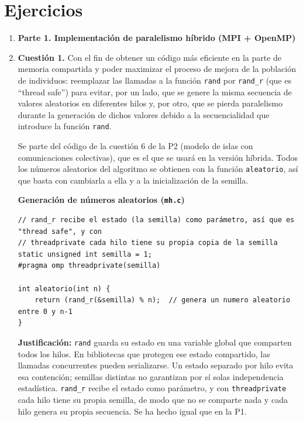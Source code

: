 \documentclass[12pt]{article}
\begin{document}
\newpage

\section{Ejercicios}

\begin{enumerate}

\item[] \textbf{\large Parte 1. Implementación de paralelismo híbrido (MPI + OpenMP)}

\item \textbf{Cuestión 1.} Con el fin de obtener un código más eficiente en la parte de memoria compartida y poder maximizar el proceso de mejora de la población de individuos: reemplazar las llamadas a la función \texttt{rand} por \texttt{rand\_r} (que es ``thread safe'') para evitar, por un lado, que se genere la misma secuencia de valores aleatorios en diferentes hilos y, por otro, que se pierda paralelismo durante la generación de dichos valores debido a la secuencialidad que introduce la función \texttt{rand}.


Se parte del código de la cuestión 6 de la P2 (modelo de islas con comunicaciones colectivas), que es el que se usará en la versión híbrida. Todos los números aleatorios del algoritmo se obtienen con la función \texttt{aleatorio}, así que basta con cambiarla a ella y a la inicialización de la semilla.

\medskip
\noindent\textbf{Generación de números aleatorios (\texttt{mh.c})}\par
\smallskip

\begin{lstlisting}[style=EstiloC]
// rand_r recibe el estado (la semilla) como parámetro, así que es "thread safe", y con
// threadprivate cada hilo tiene su propia copia de la semilla
static unsigned int semilla = 1;
#pragma omp threadprivate(semilla)

int aleatorio(int n) {
	return (rand_r(&semilla) % n);  // genera un numero aleatorio entre 0 y n-1
}
\end{lstlisting}

\textbf{Justificación:} \texttt{rand} guarda su estado en una variable global que comparten todos los hilos. En bibliotecas que protegen ese estado compartido, las llamadas concurrentes pueden serializarse. Un estado separado por hilo evita esa contención; semillas distintas no garantizan por sí solas independencia estadística. \texttt{rand\_r} recibe el estado como parámetro, y con \texttt{threadprivate} cada hilo tiene su propia semilla, de modo que no se comparte nada y cada hilo genera su propia secuencia. Se ha hecho igual que en la P1.


\end{enumerate}
\end{document}
